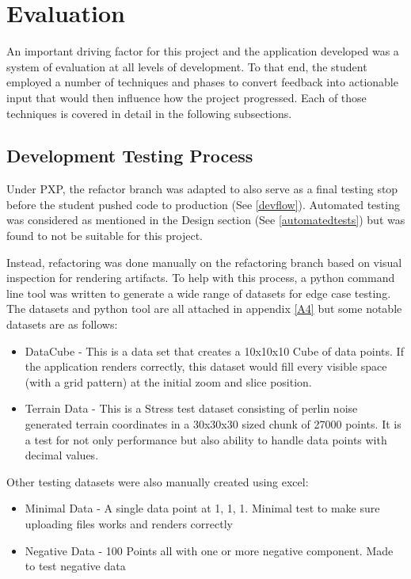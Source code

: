 \section{Evaluation}
An important driving factor for this project and the application developed was a system of evaluation at all levels of development. To that end, the student employed a
number of techniques and phases to convert feedback into actionable input that would then influence how the project progressed. Each of those techniques is covered in detail in the following subsections.

\subsection{Development Testing Process} \label{devtest}
Under PXP, the refactor branch was adapted to also serve as a final testing stop before the student pushed code to production (See \ref{devflow}). Automated testing was considered as mentioned in the Design section (See \ref{automatedtests}) but was found to not be suitable for this project.

Instead, refactoring was done manually on the refactoring branch based on visual inspection for rendering artifacts. To help with this process, a python command line tool was written to generate a wide range of datasets for edge case testing. The datasets and python tool are all attached in appendix \ref{A4} but some notable datasets are as follows:

\begin{itemize}
    \item DataCube - This is a data set that creates a 10x10x10 Cube of data points. If the application renders correctly, this dataset would fill every visible space (with a grid pattern) at the initial zoom and slice position.
    \item Terrain Data - This is a Stress test dataset consisting of perlin noise generated terrain coordinates in a 30x30x30 sized chunk of 27000 points. It is a test for not only performance but also ability to handle data points with decimal values.
\end{itemize}

Other testing datasets were also manually created using excel:
\begin{itemize}
    \item Minimal Data - A single data point at 1, 1, 1. Minimal test to make sure uploading files works and renders correctly
    \item Negative Data - 100 Points all with one or more negative component. Made to test negative data
\end{itemize}

